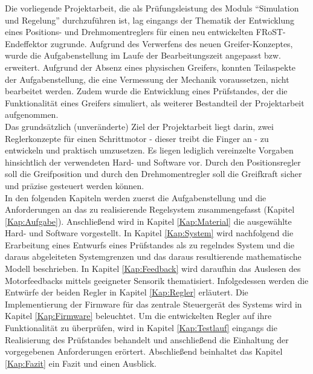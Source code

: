 
Die vorliegende Projektarbeit, die als Prüfungsleistung des Moduls ``Simulation und Regelung'' durchzuführen ist, lag eingangs der Thematik der Entwicklung eines Positions- und Drehmomentreglers für einen neu entwickelten FRoST-Endeffektor zugrunde. Aufgrund des Verwerfens des neuen Greifer-Konzeptes, wurde die Aufgabenstellung im Laufe der Bearbeitungszeit angepasst bzw. erweitert. Aufgrund der Absenz eines physischen Greifers, konnten Teilaspekte der Aufgabenstellung, die eine Vermessung der Mechanik voraussetzen, nicht bearbeitet werden. Zudem wurde die Entwicklung eines Prüfstandes, der die Funktionalität eines Greifers simuliert, als weiterer Bestandteil der Projektarbeit aufgenommen.\\

Das grundsätzlich (unveränderte) Ziel der Projektarbeit liegt darin, zwei Reglerkonzepte für einen Schrittmotor - dieser treibt die Finger an - zu entwickeln und praktisch umzusetzen. Es liegen lediglich vereinzelte Vorgaben hinsichtlich der verwendeten Hard- und Software vor. Durch den Positionsregler soll die Greifposition und durch den Drehmomentregler soll die Greifkraft sicher und präzise gesteuert werden können.\\

In den folgenden Kapiteln werden zuerst die Aufgabenstellung und die Anforderungen an das zu realisierende Regelsystem zusammengefasst (Kapitel \ref{Kap:Aufgabe}). Anschließend wird in Kapitel \ref{Kap:Material} die ausgewählte Hard- und Software vorgestellt. In Kapitel \ref{Kap:System} wird nachfolgend die Erarbeitung eines Entwurfs eines Prüfstandes als zu regelndes System und die daraus abgeleiteten Systemgrenzen und das daraus resultierende mathematische Modell beschrieben. In Kapitel \ref{Kap:Feedback} wird daraufhin das Auslesen des Motorfeedbacks mittels geeigneter Sensorik thematisiert. Infolgedessen werden die Entwürfe der beiden Regler in Kapitel \ref{Kap:Regler} erläutert. Die Implementierung der Firmware für das zentrale Steuergerät des Systems wird in Kapitel \ref{Kap:Firmware} beleuchtet. Um die entwickelten Regler auf ihre Funktionalität zu überprüfen, wird in Kapitel \ref{Kap:Testlauf} eingangs die Realisierung des Prüfstandes behandelt und anschließend die Einhaltung der vorgegebenen Anforderungen erörtert. Abschließend beinhaltet das Kapitel \ref{Kap:Fazit} ein Fazit und einen Ausblick.

